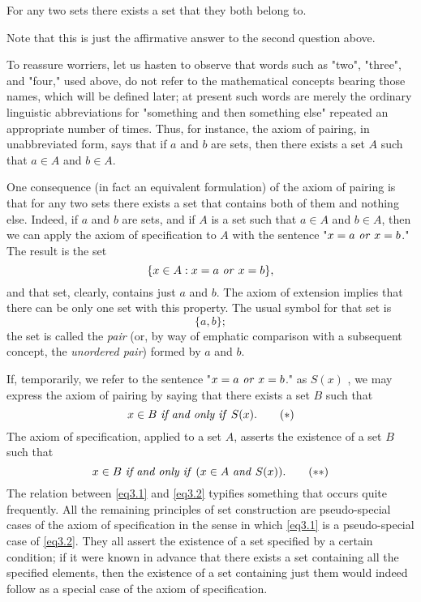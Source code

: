 \begin{named}  For any two sets there exists a set that they both belong to.
\end{named}

\noindent Note that this is just the affirmative answer to the second question above.

To reassure worriers, let us hasten to observe that words such as "two", "three", and "four," used above, do not refer to the mathematical concepts bearing those names, which will be defined later; at present such words are merely the ordinary linguistic abbreviations for "something and then something else" repeated an appropriate number of times. Thus, for instance, the axiom of pairing, in unabbreviated form, says that if $a$ and $b$ are sets, then there exists a set $A$ such that $a \in A$ and $b \in A$.

One consequence (in fact an equivalent formulation) of the axiom of pairing is that for any two sets there exists a set that contains both of them and nothing else. Indeed, if $a$ and $b$ are sets, and if $A$ is a set such that $a \in A$ and $b \in A$, then we can apply the axiom of specification to $A$ with the sentence "$x = a \text{ \textit{or} } x = b$." The result is the set 
\begin{equation*}
\{ x \in A: x = a \text{ \textit{or} } x = b \},
\end{equation*}
and that set, clearly, contains just $a$ and $b$. The axiom of extension implies that there can be only one set with this property. The usual symbol for that set is
\begin{equation*}
\{ a, b \};
\end{equation*}
the set is called the \textit{pair} (or, by way of emphatic comparison with a subsequent concept, the \textit{unordered pair}) formed by $a$ and $b$. 

If, temporarily, we refer to the sentence "$x = a \text{ \textit{or} } x = b$." as $S(x)$ , we may express the axiom of pairing by saying that there exists a set $B$ such that 
\begin{equation}
\label{eq3.1}
x \in B \text{ \textit{if and only if} } S(x). \tag{$\ast$}
\end{equation}
The axiom of specification, applied to a set $A$, asserts the existence of a set $B$ such that 
\begin{equation}
\label{eq3.2}
x \in B \text{ \textit{if and only if} } (x \in A \text{ \textit{and} }  S(x)). \tag{$\ast \ast$}
\end{equation}
The relation between \eqref{eq3.1} and \eqref{eq3.2} typifies something that occurs quite frequently. All the remaining principles of set construction are pseudo-special cases of the axiom of specification in the sense in which \eqref{eq3.1} is a pseudo-special case of \eqref{eq3.2}. They all assert the existence of a set specified by a certain condition; if it were known in advance that there exists a set containing all the specified elements, then the existence of a set containing just them would indeed follow as a special case of the axiom of specification. 

